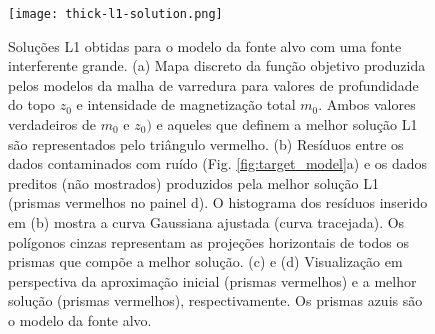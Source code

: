 \begin{figure}[!htb]
	\centering
	\texttt{[image: thick-l1-solution.png]}
	\caption{Soluções L1 obtidas para o modelo da fonte alvo com uma fonte interferente grande. 
		(a) Mapa discreto da função objetivo produzida pelos modelos da malha de varredura para valores de profundidade do topo $z_{0}$ e intensidade de magnetização total $m_{0}$. 
		Ambos valores verdadeiros de $m_{0}$ e $z_{0})$ e aqueles que definem a melhor solução L1 são representados pelo triângulo vermelho.
		(b) Resíduos entre os dados contaminados com ruído (Fig. \ref{fig:target_model}a) 
		e os dados preditos (não mostrados) produzidos pela melhor solução L1 (prismas vermelhos no painel d). 
		O histograma dos resíduos inserido em (b) mostra a curva Gaussiana ajustada (curva tracejada).
		Os polígonos cinzas representam as projeções horizontais de todos os prismas que compõe a melhor solução. 
		(c) e (d) Visualização em perspectiva da aproximação inicial (prismas vermelhos) e 
		a melhor solução (prismas vermelhos), respectivamente. Os prismas azuis são o modelo da fonte alvo. 
	}
	\label{fig:thick_l1_result}
\end{figure}